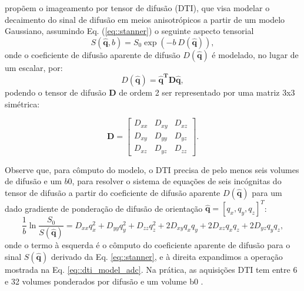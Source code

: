 \documentclass[
    12pt,                %
    oneside,            %
    a4paper,            %
    english,            %
    french,                %
    spanish,            %
    brazil                %
    ]{abntex2}
\begin{document}
 propõem o imageamento por tensor de difusão (DTI), que visa modelar o decaimento do sinal de difusão em meios anisotrópicos a partir de um modelo Gaussiano, assumindo Eq. (\ref {eq::stanner}) o seguinte aspecto tensorial
\begin{equation}
\label{eq::dti_model}
    S(\mathbf{\hat{q}}, b) = S_0\exp{(-b~D(\mathbf{\hat{q}}))}, 
\end{equation}
onde o coeficiente de difusão aparente de difusão $D(\mathbf{\hat{q}})$ é modelado, no lugar de um escalar, por:
\begin{equation}
\label{eq::dti_model_adc}
    D(\mathbf{\hat{q}}) = \mathbf{\hat{q}^T}\mathbf{D}\mathbf{\hat{q}},
\end{equation} 
podendo o tensor de difusão $\mathbf{D}$ de ordem 2  ser representado por uma matriz 3x3 simétrica:

\begin{equation}
\label{eq::tensor}
\mathbf{D} = 
\begin{bmatrix}
D_{xx} & D_{xy} & D_{xz} \\ 
D_{xy} & D_{yy} & D_{yz} \\ 
D_{xz} & D_{yz} & D_{zz}  
\end{bmatrix}.
\end{equation}


Observe que, para cômputo do modelo, o DTI precisa de pelo menos seis volumes de difusão e um $b0$, para resolver o sistema de equações de seis incógnitas do tensor de difusão a partir do coeficiente de difusão aparente $D(\mathbf{\hat{q}})$ para um dado gradiente de ponderação de difusão de orientação $\mathbf{\hat{q}} = [q_x, q_y, q_z]^T$:
\begin{equation}
\label{eq::sistema_dti}
\frac{1}{b}\ln{\frac{S_0}{S(\mathbf{\hat{q}})}}=D_{x x} q_{x}^{2} +D_{y y} q_{y}^{2}+D_{z z} q_{z}^{2}+2 D_{x y} q_{x} q_{y} +2 D_{x z} q_{x} q_{z}+2 D_{y z} q_{y} q_{z} ,
\end{equation}
onde o termo à esquerda é o cômputo do coeficiente aparente de difusão para o sinal $S(\mathbf{\hat{q}})$ derivado da Eq. \ref{eq::stanner}, e à direita expandimos a operação mostrada na Eq. \ref{eq::dti_model_adc}. Na prática, as aquisições DTI tem entre 6 e 32 volumes ponderados por difusão e um volume b0 \cite{descoteaux2015}. 
\end{document}
